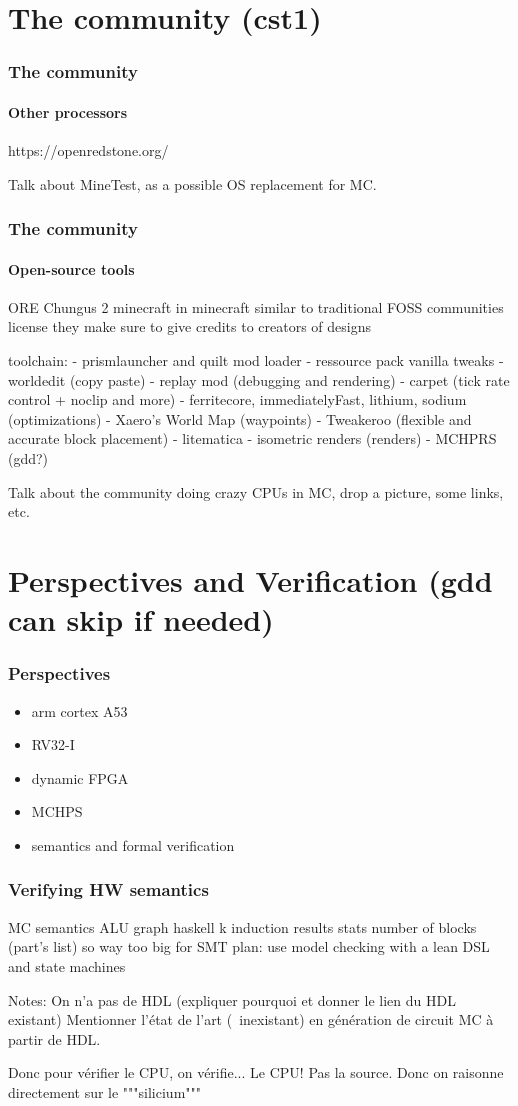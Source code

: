 \documentclass[aspectratio=169]{beamer}
\begin{document}
\section{The community (cst1)}

\begin{frame}
	\frametitle{The community}
	\framesubtitle{Other processors}

	https://openredstone.org/

	Talk about MineTest, as a possible OS replacement for MC.
\end{frame}

\begin{frame}
	\frametitle{The community}
	\framesubtitle{Open-source tools}

\end{frame}

\begin{frame}
	ORE
	Chungus 2
	minecraft in minecraft
	similar to traditional FOSS communities
	license
	they make sure to give credits to creators of designs

	toolchain:
	- prismlauncher and quilt mod loader
	- ressource pack vanilla tweaks
	- worldedit (copy paste)
	- replay mod (debugging and rendering)
	- carpet (tick rate control + noclip and more)
	- ferritecore, immediatelyFast, lithium, sodium (optimizations)
	- Xaero's World Map (waypoints)
	- Tweakeroo (flexible and accurate block placement)
	- litematica
	- isometric renders (renders)
	- MCHPRS (gdd?)

	Talk about the community doing crazy CPUs in MC, drop a picture, some
	links, etc.
\end{frame}

\section{Perspectives and Verification (gdd can skip if needed)}
\begin{frame}
	\frametitle{Perspectives}
	\begin{itemize}
		\item arm cortex A53
		\item RV32-I
		\item dynamic FPGA
		\item MCHPS
		\item semantics and formal verification
	\end{itemize}
\end{frame}

\begin{frame}
	\frametitle{Verifying HW semantics}
	MC semantics
	ALU graph
	haskell k induction
	results
	stats number of blocks (part's list)
	so way too big for SMT
	plan: use model checking with a lean DSL and state machines



	Notes: On n'a pas de HDL (expliquer pourquoi et donner le lien du HDL existant)
	Mentionner l'état de l'art (~inexistant) en génération de circuit MC à
	partir de HDL.

	Donc pour vérifier le CPU, on vérifie... Le CPU! Pas la source.
	Donc on raisonne directement sur le """silicium"""
\end{frame}
\end{document}

